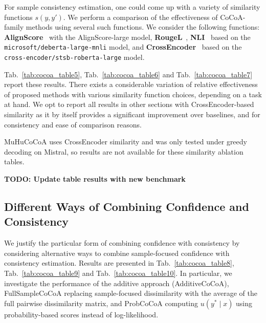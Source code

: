 \documentclass[11pt]{article}
\newcommand{\method}{MuHuCoCoA}
\newcommand{\tabref}[1]{Tab.~\ref{#1}}
\begin{document}
For sample consistency estimation, one could come up with a variety of similarity functions $s(y, y')$. We perform a comparison of the effectiveness of CoCoA-family methods using several such functions. We consider the following functions: \textbf{AlignScore}~\cite{zha2023alignscore} with the AlignScore-large model, \textbf{RougeL}~\cite{lin2004rouge}, \textbf{NLI}~\cite{he2021deberta} based on the \texttt{microsoft/deberta-large-mnli} model, and \textbf{CrossEncoder}~\cite{liu2019roberta} based on the \texttt{cross-encoder/stsb-roberta-large} model.

\tabref{tab:cocoa_table5}, \tabref{tab:cocoa_table6} and \tabref{tab:cocoa_table7} report these results. There exists a considerable variation of relative effectiveness of proposed methods with various similarity function choices, depending on a task at hand. We opt to report all results in other sections with CrossEncoder-based similarity as it by itself provides a significant improvement over baselines, and for consistency and ease of comparison reasons.

\method{} uses CrossEncoder similarity and was only tested under greedy decoding on Mistral, so results are not available for these similarity ablation tables.

\textbf{TODO: Update table results with new benchmark}


\subsection{Different Ways of Combining Confidence and Consistency}
\label{app:ablation_combination}

We justify the particular form of combining confidence with consistency by considering alternative ways to combine sample-focused confidence with consistency estimation. Results are presented in \tabref{tab:cocoa_table8}, \tabref{tab:cocoa_table9} and \tabref{tab:cocoa_table10}. In particular, we investigate the performance of the additive approach (AdditiveCoCoA), FullSampleCoCoA replacing sample-focused dissimilarity with the average of the full pairwise dissimilarity matrix, and ProbCoCoA computing $u(y^{*} \mid x)$ using probability-based scores instead of log-likelihood.
\end{document}

